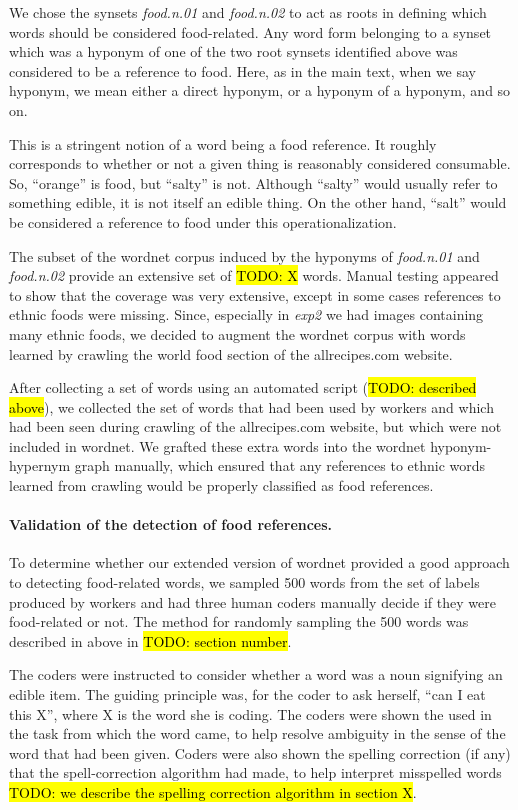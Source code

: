 \documentclass[12pt]{article}
\newcommand{\td}[1]{{\color{blu}\hl{TODO: #1}}}
\begin{document}
We chose the synsets \textit{food.n.01} and \textit{food.n.02} to act as roots
in defining which words should be considered food-related.  Any word form
belonging to a synset which was a hyponym of one of the two root synsets
identified above was considered to be a reference to food.  Here, as in the
main text, when we say hyponym, we mean either a direct hyponym, or a hyponym
of a hyponym, and so on.

This is a stringent notion of a word being a food reference.  It roughly
corresponds to whether or not a given thing is reasonably considered 
consumable.  So, ``orange'' is food, but ``salty'' is not.  Although ``salty''
would usually refer to something edible, it is not itself an edible thing.
On the other hand, ``salt'' would be considered a reference to food under 
this operationalization.

The subset of the wordnet corpus induced by the hyponyms of \textit{food.n.01}
and \textit{food.n.02} provide an extensive set of \td{X} words.  Manual
testing appeared to show that the coverage was very extensive, except in 
some cases references to ethnic foods were missing.  Since, especially in
\textit{exp2} we had images containing many ethnic foods, we decided to 
augment the wordnet corpus with words learned by crawling the world food
section of the allrecipes.com website.  

After collecting a set of words using an automated script 
(\td{described above}), we collected the set of words that had been used by
workers and which had been seen during crawling of the allrecipes.com website,
but which were not included in wordnet.  We grafted these extra words into
the wordnet hyponym-hypernym graph manually, which ensured that any references
to ethnic words learned from crawling would be properly classified as 
food references.

\paragraph{Validation of the detection of food references.}
To determine whether our extended version of wordnet provided a good approach
to detecting food-related words, we sampled 500 words from the set of labels
produced by workers and had three human coders manually decide if they were 
food-related or not.  The method for randomly sampling the 500 words was 
described in above in \td{section number}.

The coders were instructed to consider whether a word was a noun signifying
an edible item.  The guiding principle was, for the coder to ask herself,
``can I eat this X'', where X is the word she is coding.  The coders were
shown the used in the task from which the word came, to help resolve ambiguity
in the sense of the word that had been given.  Coders were also shown the 
spelling correction (if any) that the spell-correction algorithm had made,
to help interpret misspelled words \td{we describe the spelling correction 
algorithm in section X}.
\end{document}
